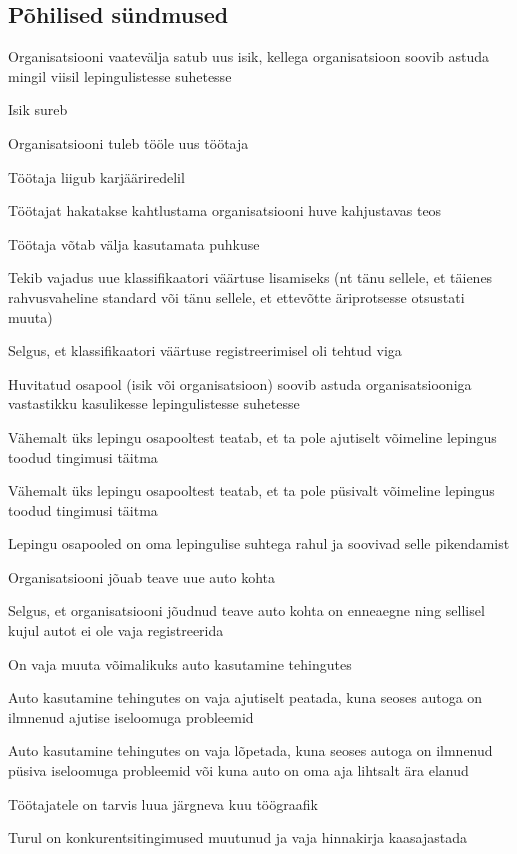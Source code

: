 \subsection{Põhilised sündmused}
\begin{myitemize}
	\item Organisatsiooni vaatevälja satub uus isik, kellega organisatsioon soovib  astuda mingil viisil lepingulistesse suhetesse
	\item Isik sureb
	\item Organisatsiooni tuleb tööle uus töötaja
	\item Töötaja liigub karjääriredelil
	\item Töötajat hakatakse kahtlustama organisatsiooni huve kahjustavas teos
	\item Töötaja võtab välja kasutamata puhkuse
	\item Tekib vajadus uue klassifikaatori väärtuse lisamiseks (nt tänu sellele, et täienes rahvusvaheline standard või tänu sellele, et ettevõtte äriprotsesse otsustati muuta)
	\item Selgus, et klassifikaatori väärtuse registreerimisel oli tehtud viga
	\item Huvitatud osapool (isik või organisatsioon) soovib astuda organisatsiooniga vastastikku kasulikesse lepingulistesse suhetesse
	\item Vähemalt üks lepingu osapooltest teatab, et ta pole ajutiselt võimeline lepingus toodud tingimusi täitma
	\item Vähemalt üks lepingu osapooltest teatab, et ta pole püsivalt võimeline lepingus toodud tingimusi täitma
	\item Lepingu osapooled on oma lepingulise suhtega rahul ja soovivad selle pikendamist
	\item Organisatsiooni jõuab teave uue auto kohta
	\item Selgus, et organisatsiooni jõudnud teave auto kohta on enneaegne ning sellisel kujul autot ei ole vaja registreerida
	\item On vaja muuta võimalikuks auto kasutamine tehingutes
	\item Auto kasutamine tehingutes on vaja ajutiselt peatada, kuna seoses autoga on ilmnenud ajutise iseloomuga probleemid
	\item Auto kasutamine tehingutes on vaja lõpetada, kuna seoses autoga on ilmnenud püsiva iseloomuga probleemid või kuna auto on oma aja lihtsalt ära elanud
	\item Töötajatele on tarvis luua järgneva kuu töögraafik
	\item Turul on konkurentsitingimused muutunud ja vaja hinnakirja kaasajastada

\end{myitemize}
